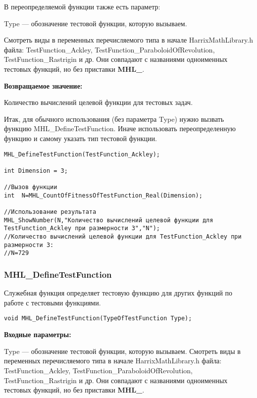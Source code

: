 \documentclass[a4paper,12pt]{article}
\begin{document}
В переопределяемой функции также есть параметр:
  
Type --- обозначение тестовой функции, которую вызываем. 

Смотреть виды в переменных перечисляемого типа в начале HarrixMathLibrary.h файла: TestFunction\_Ackley, TestFunction\_ParaboloidOfRevolution, TestFunction\_Rastrigin и др. Они совпадают с названиями одноименных тестовых функций, но без приставки \textbf{MHL\_}.

\textbf{Возвращаемое значение:}
 
Количество вычислений целевой функции для тестовых задач.

Итак, для обычного использования (без параметра Type) нужно вызвать функцию MHL\_DefineTestFunction. Иначе использовать переопределенную функцию и самому указать тип тестовой функции.


\begin{lstlisting}[label=code_use_MHL_CountOfFitnessOfTestFunction_Real,caption=Пример использования]
MHL_DefineTestFunction(TestFunction_Ackley);

int Dimension = 3;

//Вызов функции
int  N=MHL_CountOfFitnessOfTestFunction_Real(Dimension);

//Использование результата
MHL_ShowNumber(N,"Количество вычислений целевой функции для TestFunction_Ackley при размерности 3","N");
//Количество вычислений целевой функции для TestFunction_Ackley при размерности 3:
//N=729
\end{lstlisting}

\subsubsection{MHL\_DefineTestFunction}\label{MHL_DefineTestFunction}

Служебная функция определяет тестовую функцию для других функций по работе с тестовыми функциями.


\begin{lstlisting}[label=code_syntax_MHL_DefineTestFunction,caption=Синтаксис]
void MHL_DefineTestFunction(TypeOfTestFunction Type);
\end{lstlisting}

\textbf{Входные параметры:}
  
Type --- обозначение тестовой функции, которую вызываем.
Смотреть виды в переменных перечисляемого типа в начале HarrixMathLibrary.h файла: TestFunction\_Ackley, TestFunction\_ParaboloidOfRevolution, TestFunction\_Rastrigin и др. Они совпадают с названиями одноименных тестовых функций, но без приставки \textbf{MHL\_}.
\end{document}
